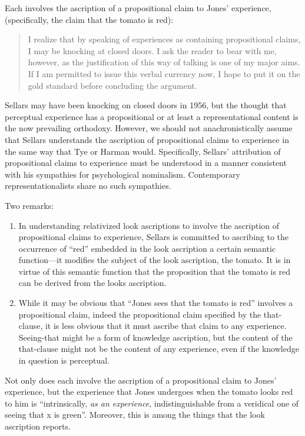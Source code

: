 \documentclass[11pt]{article}
\begin{document}
Each involves the ascription of a propositional claim to Jones' experience, (specifically, the claim that the tomato is red):
\begin{quote}
    I realize that by speaking of experiences as containing propositional claims, I may be knocking at closed doors. I ask the reader to bear with me, however, as the justification of this way of talking is one of my major aims. If I am permitted to issue this verbal currency now, I hope to put it on the gold standard before concluding the argument.
\end{quote}
Sellars may have been knocking on closed doors in 1956, but the thought that perceptual experience has a propositional or at least a representational content is the now prevailing orthodoxy. However, we should not anachronistically assume that Sellars understands the ascription of propositional claims to experience in the same way that Tye or Harman would. Specifically, Sellars' attribution of propositional claims to experience must be understood in a manner consistent with his sympathies for psychological nominalism. Contemporary representationalists share no such sympathies. 

Two remarks:
\begin{enumerate}
\item In understanding relativized look ascriptions to involve the ascription of propositional claims to experience, Sellars is committed to ascribing to the occurrence of ``red'' embedded in the look ascription a certain semantic function---it modifies the subject of the look ascription, the tomato. It is in virtue of this semantic function that the proposition that the tomato is red can be derived from the looks ascription.
\item While it may be obvious that ``Jones sees that the tomato is red'' involves a propositional claim, indeed the propositional claim specified by the that-clause, it is less obvious that it must ascribe that claim to any experience. Seeing-that might be a form of knowledge ascription, but the content of the that-clause might not be the content of any experience, even if the knowledge in question is perceptual.
\end{enumerate}

Not only does each involve the ascription of a propositional claim to Jones' experience, but the experience that Jones undergoes when the tomato looks red to him is ``intrinsically, \emph{as an experience}, indistinguishable from a veridical one of seeing that x is green''. Moreover, this is among the things that the look ascription reports.
\end{document}
